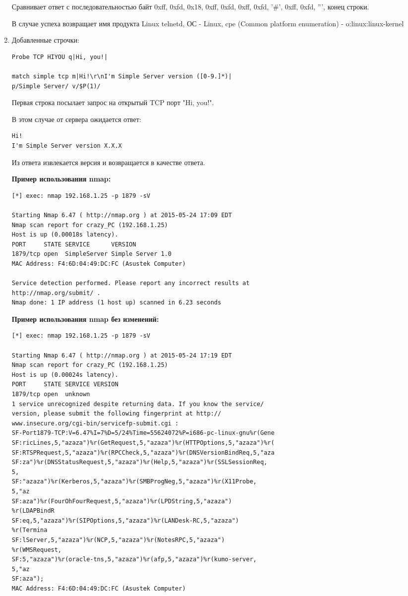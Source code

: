 \documentclass{article}
\begin{document}
\begin{enumerate}
Сравнивает ответ с последовательностью байт 0xff, 0xfd, 0x18, 0xff, 0xfd, 0xff, 0xfd, '\#', 0xff, 0xfd, ''', конец строки.

В случае успеха возвращает имя продукта Linux telnetd, ОС - Linux, cpe (Common platform enumeration) - o:linux:linux-kernel


\item Добавленные строчки:
\begin{verbatim}
Probe TCP HIYOU q|Hi, you!|

match simple tcp m|Hi!\r\nI'm Simple Server version ([0-9.]*)| 
p/Simple Server/ v/$P(1)/
\end{verbatim}

Первая строка посылает запрос на открытый TCP порт "Hi, you!".

В этом случае от сервера ожидается ответ:
\begin{verbatim}
Hi!
I'm Simple Server version X.X.X
\end{verbatim}

Из ответа извлекается версия и возвращается в качестве ответа.

\textbf{Пример использования nmap:}

\begin{verbatim}
[*] exec: nmap 192.168.1.25 -p 1879 -sV

Starting Nmap 6.47 ( http://nmap.org ) at 2015-05-24 17:09 EDT
Nmap scan report for crazy_PC (192.168.1.25)
Host is up (0.00018s latency).
PORT     STATE SERVICE      VERSION
1879/tcp open  SimpleServer Simple Server 1.0
MAC Address: F4:6D:04:49:DC:FC (Asustek Computer)

Service detection performed. Please report any incorrect results at 
http://nmap.org/submit/ .
Nmap done: 1 IP address (1 host up) scanned in 6.23 seconds
\end{verbatim}

\textbf{Пример использования nmap без изменений:}

\begin{verbatim}
[*] exec: nmap 192.168.1.25 -p 1879 -sV

Starting Nmap 6.47 ( http://nmap.org ) at 2015-05-24 17:19 EDT
Nmap scan report for crazy_PC (192.168.1.25)
Host is up (0.00024s latency).
PORT     STATE SERVICE VERSION
1879/tcp open  unknown
1 service unrecognized despite returning data. If you know the service/
version, please submit the following fingerprint at http://
www.insecure.org/cgi-bin/servicefp-submit.cgi :
SF-Port1879-TCP:V=6.47%I=7%D=5/24%Time=55624072%P=i686-pc-linux-gnu%r(Gene
SF:ricLines,5,"azaza")%r(GetRequest,5,"azaza")%r(HTTPOptions,5,"azaza")%r(
SF:RTSPRequest,5,"azaza")%r(RPCCheck,5,"azaza")%r(DNSVersionBindReq,5,"aza
SF:za")%r(DNSStatusRequest,5,"azaza")%r(Help,5,"azaza")%r(SSLSessionReq,
5,
SF:"azaza")%r(Kerberos,5,"azaza")%r(SMBProgNeg,5,"azaza")%r(X11Probe,
5,"az
SF:aza")%r(FourOhFourRequest,5,"azaza")%r(LPDString,5,"azaza")
%r(LDAPBindR
SF:eq,5,"azaza")%r(SIPOptions,5,"azaza")%r(LANDesk-RC,5,"azaza")
%r(Termina
SF:lServer,5,"azaza")%r(NCP,5,"azaza")%r(NotesRPC,5,"azaza")
%r(WMSRequest,
SF:5,"azaza")%r(oracle-tns,5,"azaza")%r(afp,5,"azaza")%r(kumo-server,
5,"az
SF:aza");
MAC Address: F4:6D:04:49:DC:FC (Asustek Computer)


\end{verbatim}
\end{enumerate}
\end{document}
